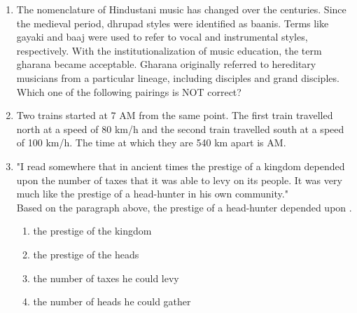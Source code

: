 \documentclass[journal]{IEEEtran}
\numberwithin{equation}{enumi}
\numberwithin{figure}{enumi}
\begin{document}
\begin{enumerate}
    \item The nomenclature of Hindustani music has changed over the centuries. Since the medieval period, dhrupad styles were identified as baanis. Terms like gayaki and baaj were used to refer to vocal and instrumental styles, respectively. With the institutionalization of music education, the term gharana became acceptable. Gharana originally referred to hereditary musicians from a particular lineage, including disciples and grand disciples.\\
    Which one of the following pairings is NOT correct?\\
    \begin{enumerate}
    \end{enumerate}
    \bigskip

    \item Two trains started at 7 AM from the same point. The first train travelled north at a speed of 80 km/h and the second train travelled south at a speed of 100 km/h. The time at which they are 540 km apart is \underline{\hspace{2cm}} AM.\\
    \begin{enumerate}
    \end{enumerate}
    \bigskip
    \item "I read somewhere that in ancient times the prestige of a kingdom depended upon the number of taxes that it was able to levy on its people. It was very much like the prestige of a head-hunter in his own community."\\
    Based on the paragraph above, the prestige of a head-hunter depended upon \underline{\hspace{2cm}}.\\
    \begin{enumerate}
        \item the prestige of the kingdom
        \item the prestige of the heads
        \item the number of taxes he could levy
        \item the number of heads he could gather
    \end{enumerate}
    \bigskip
    \end{enumerate}
\end{document}
